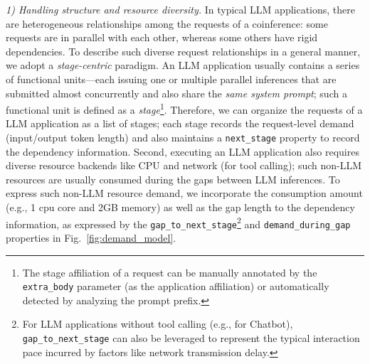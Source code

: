 \textit{1) Handling structure and resource diversity.}
In typical LLM applications, there are heterogeneous relationships among the requests of a coinference: some requests are in parallel with each other,
whereas some others have rigid dependencies. %
To describe such diverse request relationships in a general manner, we adopt a \emph{stage-centric} paradigm.
An LLM application usually contains a series of functional units---each issuing one or multiple parallel inferences that are submitted almost concurrently and also share the \emph{same system prompt}; such a functional unit is defined as a \emph{stage}\footnote{
    The stage affiliation of a request can be manually annotated by the \texttt{extra\_body} parameter (as the application affiliation) or automatically detected by analyzing the prompt prefix.
}.
Therefore, we can organize the requests of a LLM application as a list of stages; each stage records the request-level demand (input/output token length) and also maintains a \texttt{next\_stage} property to record the dependency information.
Second, executing an LLM application also requires diverse resource backends like CPU and network (for tool calling); such non-LLM resources are usually consumed  during the gaps between LLM inferences.
To express such non-LLM resource demand, we incorporate the consumption amount (e.g., 1 cpu core and 2GB memory) as well as the gap length to the dependency information, as expressed by the \texttt{gap\_to\_next\_stage}\footnote{
For LLM applications without tool calling (e.g., for Chatbot), \texttt{gap\_to\_next\_stage} can also be leveraged to represent the typical interaction pace incurred by factors like network transmission delay. 
} and \texttt{demand\_during\_gap} properties in Fig.~\ref{fig:demand_model}.

